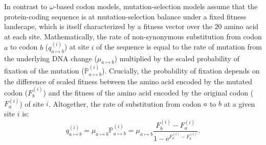 \documentclass[9pt,twocolumn,twoside,lineno]{pnas-new}
\newcommand{\e}{\mathrm{e}}
\newcommand{\proba}{\mathbb{P}}
\begin{document}
{       In contrast to $\omega$-based codon models, mutation-selection models assume that the protein-coding sequence is at mutation-selection balance under a fixed fitness landscape, which is itself characterized by a fitness vector over the $20$ amino acid at each site\cite{yang_mutationselection_2008, halpern_evolutionary_1998, rodrigue_mechanistic_2010}.
       Mathematically, the rate of non-synonymous substitution from codon $a$ to codon $b$ ($q_{a \mapsto b}^{(i)}$) at site $i$ of the sequence is equal to the rate of mutation from the underlying DNA change ($\mu_{a \mapsto b}$) multiplied by the scaled probability of fixation of the mutation ($\proba_{a \mapsto b}^{(i)}$).
       Crucially, the probability of fixation depends on the difference of scaled fitness between the amino acid encoded by the mutated codon ($F_b^{(i)}$) and the fitness of the amino acid encoded by the original codon ($F_a^{(i)}$) of site $i$\cite{wright_evolution_1931, fisher_genetical_1930}.
       Altogether, the rate of substitution from codon $a$ to $b$ at a given site $i$ is:
       \begin{equation}
              q_{a \mapsto b}^{(i)} = \mu_{a \mapsto b} \proba_{a \mapsto b}^{(i)} = \mu_{a \mapsto b} \dfrac{F_b^{(i)} - F_a^{(i)}}{1 - \e^{F_a^{(i)} - F_b^{(i)}}}.
       \end{equation}

}
\end{document}
